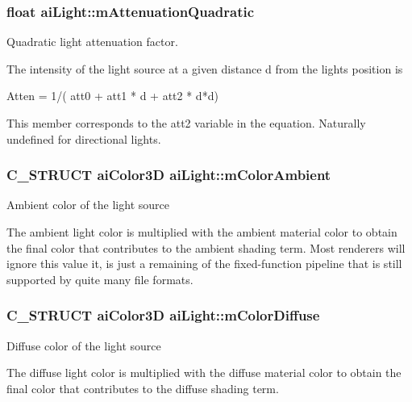 \subsubsection[{\texorpdfstring{m\+Attenuation\+Quadratic}{mAttenuationQuadratic}}]{\setlength{\rightskip}{0pt plus 5cm}float ai\+Light\+::m\+Attenuation\+Quadratic}\hypertarget{structai_light_ab4fb07bfa40a807661b1ed1791838a6d}{}\label{structai_light_ab4fb07bfa40a807661b1ed1791838a6d}
Quadratic light attenuation factor.

The intensity of the light source at a given distance \textquotesingle{}d\textquotesingle{} from the light\textquotesingle{}s position is 
\begin{DoxyCode}
Atten = 1/( att0 + att1 * d + att2 * d*d)
\end{DoxyCode}
 This member corresponds to the att2 variable in the equation. Naturally undefined for directional lights. 
\subsubsection[{\texorpdfstring{m\+Color\+Ambient}{mColorAmbient}}]{\setlength{\rightskip}{0pt plus 5cm}C\+\_\+\+S\+T\+R\+U\+CT {\bf ai\+Color3D} ai\+Light\+::m\+Color\+Ambient}\hypertarget{structai_light_a5188b60e6fbaf1635fa780913508e3cd}{}\label{structai_light_a5188b60e6fbaf1635fa780913508e3cd}
Ambient color of the light source

The ambient light color is multiplied with the ambient material color to obtain the final color that contributes to the ambient shading term. Most renderers will ignore this value it, is just a remaining of the fixed-\/function pipeline that is still supported by quite many file formats. 
\subsubsection[{\texorpdfstring{m\+Color\+Diffuse}{mColorDiffuse}}]{\setlength{\rightskip}{0pt plus 5cm}C\+\_\+\+S\+T\+R\+U\+CT {\bf ai\+Color3D} ai\+Light\+::m\+Color\+Diffuse}\hypertarget{structai_light_a22e7feebbfaf53adf73bd9f581636efd}{}\label{structai_light_a22e7feebbfaf53adf73bd9f581636efd}
Diffuse color of the light source

The diffuse light color is multiplied with the diffuse material color to obtain the final color that contributes to the diffuse shading term. 
